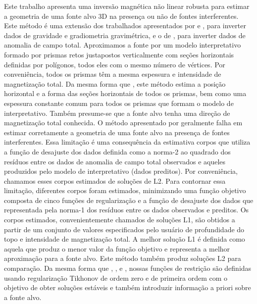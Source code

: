Este trabalho apresenta uma inversão magnética não linear robusta para estimar a geometria de uma fonte alvo 3D na presença ou não de fontes interferentes.
Este método é uma extensão dos trabalhados apresentados por \citet{oliveirajr_etal2011} e 
\citet{oliveirajr_barbosa2013}, para inverter dados de gravidade e gradiometria gravimétrica, e o de \citet{vital_etal2019}, para inverter dados de anomalia de campo total.
Aproximamos a fonte por um modelo interpretativo formado por prismas retos justapostos verticalmente com seções horizontais definidas por polígonos, todos eles com o mesmo número de vértices.
Por conveniência, todos os prismas têm a mesma espessura e intensidade de magnetização total.
Da mesma forma que \citet{vital_etal2019}, este método estima a posição horizontal e a forma das seções horizontais de todos os prismas, bem como uma espessura constante comum para todos os prismas que formam o modelo de interpretativo.
Também presume-se que a fonte alvo tenha uma direção de magnetização total conhecida.
O método apresentado por \citet{vital_etal2019} geralmente falha em estimar corretamente a geometria de uma fonte alvo na presença de fontes interferentes.
Essa limitação é uma consequência da estimativa corpos que utiliza a função de desajuste dos dados definida como a norma-2 ao quadrado dos resíduos entre os dados de anomalia de campo total observados e aqueles produzidos pelo modelo de interpretativo (dados preditos).
Por conveniência, chamamos esses corpos estimados de soluções de L2.
Para contornar essa limitação, diferentes corpos foram estimados, minimizando uma função objetivo composta de cinco funções de regularização e a função de desajuste dos dados que representada pela norma-1 dos resíduos entre os dados observados e preditos.
Os corpos estimados, convenientemente chamados de soluções L1, são obtidos a partir de um conjunto de valores especificados pelo usuário de profundidade do topo e intensidade de magnetização total.
A melhor solução L1 é definida como aquela que produz o menor valor da função objetivo e representa a melhor aproximação para a fonte alvo.
Este método também produz soluções L2 para comparação.
Da mesma forma que \citet{oliveirajr_etal2011}, \citet{oliveirajr_barbosa2013}, e \citet{vital_etal2019}, nossas funções de restrição são definidas usando regularização Tikhonov de ordem zero e de primeira ordem \citep[por exemplo,][p. 96 e 104]{aster_etal2019} com o objetivo de obter soluções estáveis e também introduzir informação a priori sobre a fonte alvo.

